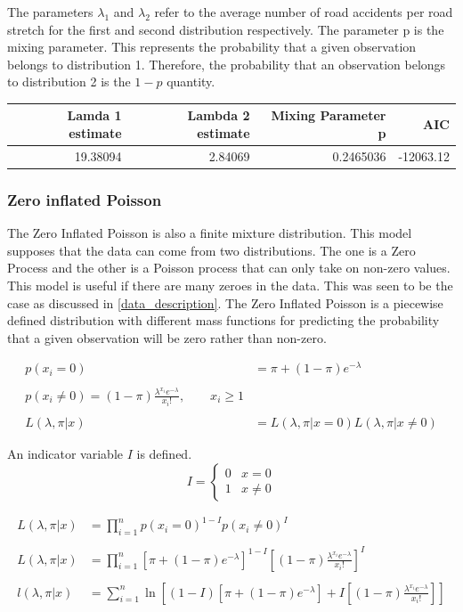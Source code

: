 \documentclass[11pt,preprint, authoryear]{elsarticle}
\numberwithin{equation}{section}
\numberwithin{figure}{section}
\numberwithin{table}{section}
\begin{document}
The parameters \(\lambda_1\) and \(\lambda_2\) refer to the average
number of road accidents per road stretch for the first and second
distribution respectively. The parameter p is the mixing parameter. This
represents the probability that a given observation belongs to
distribution 1. Therefore, the probability that an observation belongs
to distribution 2 is the \(1-p\) quantity.

\begin{longtable}[]{@{}rrrr@{}}
\toprule
Lamda 1 estimate & Lambda 2 estimate & Mixing Parameter p &
AIC\tabularnewline
\midrule
\endhead
19.38094 & 2.84069 & 0.2465036 & -12063.12\tabularnewline
\bottomrule
\end{longtable}

\subsubsection{Zero inflated Poisson}\label{zero-inflated-poisson}

The Zero Inflated Poisson is also a finite mixture distribution. This
model supposes that the data can come from two distributions. The one is
a Zero Process and the other is a Poisson process that can only take on
non-zero values. This model is useful if there are many zeroes in the
data. This was seen to be the case as discussed in
\ref{data_description}. The Zero Inflated Poisson is a piecewise defined
distribution with different mass functions for predicting the
probability that a given observation will be zero rather than non-zero.

\begin{align*}
p(x_{i}=0) &= \pi +(1-\pi )e^{{-\lambda }} \\
\\
p(x_{i} \neq 0)=(1-\pi ){\frac  {\lambda ^{{x_{i}}}e^{{-\lambda }}}{x_{i}!}},\qquad x_{i}\geq 1 \\
\\
L(\lambda,\pi|x) &= L(\lambda,\pi |x = 0)L(\lambda,\pi|x \neq 0)
\end{align*}

An indicator variable \(I\) is defined. \[ 
I =\begin{cases} 
      0 & x=0 \\
      1 & x \neq 0
   \end{cases}
\]

\begin{align*}
L(\lambda,\pi|x) &= \prod^{n}_{i=1} p(x_{i}=0)^{1 - I}p(x_{i} \neq 0)^{I} \\
\\
L(\lambda,\pi|x) &= \prod^{n}_{i=1} [\pi +(1-\pi )e^{{-\lambda }}]^{1 - I}[(1-\pi ){\frac  {\lambda ^{{x_{i}}}e^{{-\lambda }}}{x_{i}!}}]^{I} \\
\\
l(\lambda,\pi|x) &= \sum^{n}_{i=1} \ln[(1-I)[\pi +(1-\pi )e^{{-\lambda }}] + I[(1-\pi ){\frac  {\lambda ^{{x_{i}}}e^{{-\lambda }}}{x_{i}!}}]]
\end{align*}
\end{document}

